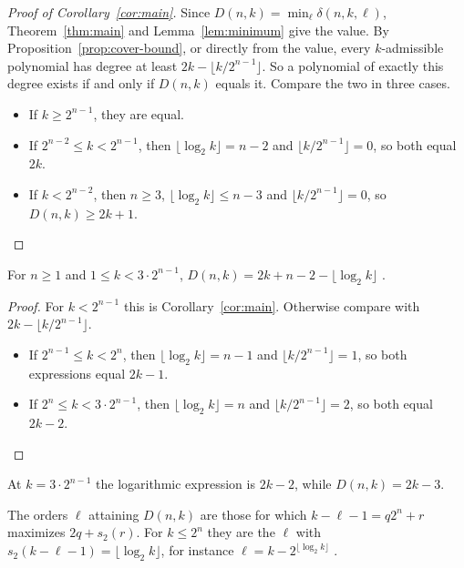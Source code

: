 \begin{proof}[Proof of Corollary~\ref{cor:main}]
Since \(D(n,k)=\min_\ell\delta(n,k,\ell)\), Theorem~\ref{thm:main} and
Lemma~\ref{lem:minimum} give the value. By Proposition~\ref{prop:cover-bound}, or
directly from the value, every \(k\)-admissible polynomial has degree at least
\(2k-\lfloor k/2^{n-1}\rfloor\). So a polynomial of exactly this degree exists if
and only if \(D(n,k)\) equals it. Compare the two in three cases.
\begin{itemize}
 \item If \(k\ge2^{n-1}\), they are equal.
 \item If \(2^{n-2}\le k<2^{n-1}\), then \(\lfloor\log_2k\rfloor=n-2\) and
 \(\lfloor k/2^{n-1}\rfloor=0\), so both equal \(2k\).
 \item If \(k<2^{n-2}\), then \(n\ge3\), \(\lfloor\log_2k\rfloor\le n-3\) and
 \(\lfloor k/2^{n-1}\rfloor=0\), so \(D(n,k)\ge2k+1\). \qedhere
\end{itemize}
\end{proof}

\begin{corollary}\label{cor:extended}
For \(n\ge1\) and \(1\le k<3\cdot2^{n-1}\), \(D(n,k)=2k+n-2-\lfloor\log_2k\rfloor\)
.
\end{corollary}

\begin{proof}
For \(k<2^{n-1}\) this is Corollary~\ref{cor:main}. Otherwise compare with
\(2k-\lfloor k/2^{n-1}\rfloor\).
\begin{itemize}
 \item If \(2^{n-1}\le k<2^n\), then \(\lfloor\log_2k\rfloor=n-1\) and
 \(\lfloor k/2^{n-1}\rfloor=1\), so both expressions equal \(2k-1\).
 \item If \(2^n\le k<3\cdot2^{n-1}\), then \(\lfloor\log_2k\rfloor=n\) and
 \(\lfloor k/2^{n-1}\rfloor=2\), so both equal \(2k-2\). \qedhere
\end{itemize}
\end{proof}

At \(k=3\cdot2^{n-1}\) the logarithmic expression is \(2k-2\), while
\(D(n,k)=2k-3\).

\begin{remark}\label{rem:extremal}
The orders \(\ell\) attaining \(D(n,k)\) are those for which \(k-\ell-1=q2^n+r\)
maximizes \(2q+s_2(r)\). For \(k\le2^n\) they are the \(\ell\) with
\(s_2(k-\ell-1)=\lfloor\log_2k\rfloor\), for instance
\(\ell=k-2^{\lfloor\log_2k\rfloor}\) .
\end{remark}

